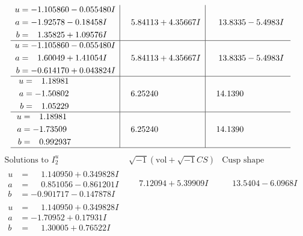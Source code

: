 \documentclass[1p]{elsarticle_modified}
\theoremstyle{definition}
\newcommand{\I}{\sqrt{-1}}
\begin{document}
$$\begin{array}{c|c|c}
\begin{aligned}
u &= -1.105860 - 0.055480 I \\
a &= -1.92578 - 0.18458 I \\
b &= \phantom{-}1.35825 + 1.09576 I\end{aligned}
 & \phantom{-}5.84113 + 4.35667 I & \phantom{-}13.8335 - 5.4983 I \\ \hline\begin{aligned}
u &= -1.105860 - 0.055480 I \\
a &= \phantom{-}1.60049 + 1.41054 I \\
b &= -0.614170 + 0.043824 I\end{aligned}
 & \phantom{-}5.84113 + 4.35667 I & \phantom{-}13.8335 - 5.4983 I \\ \hline\begin{aligned}
u &= \phantom{-}1.18981\phantom{ +0.000000I} \\
a &= -1.50802\phantom{ +0.000000I} \\
b &= \phantom{-}1.05229\phantom{ +0.000000I}\end{aligned}
 & \phantom{-}6.25240\phantom{ +0.000000I} & \phantom{-}14.1390\phantom{ +0.000000I} \\ \hline\begin{aligned}
u &= \phantom{-}1.18981\phantom{ +0.000000I} \\
a &= -1.73509\phantom{ +0.000000I} \\
b &= \phantom{-}0.992937\phantom{ +0.000000I}\end{aligned}
 & \phantom{-}6.25240\phantom{ +0.000000I} & \phantom{-}14.1390\phantom{ +0.000000I}\\
 \hline 
 \end{array}$$\newpage$$\begin{array}{c|c|c}  
\text{Solutions to }I^u_{2}& \I (\text{vol} + \sqrt{-1}CS) & \text{Cusp shape}\\
 \hline 
\begin{aligned}
u &= \phantom{-}1.140950 + 0.349828 I \\
a &= \phantom{-}0.851056 - 0.861201 I \\
b &= -0.901717 - 0.147878 I\end{aligned}
 & \phantom{-}7.12094 + 5.39909 I & \phantom{-}13.5404 - 6.0968 I \\ \hline\begin{aligned}
u &= \phantom{-}1.140950 + 0.349828 I \\
a &= -1.70952 + 0.17931 I \\
b &= \phantom{-}1.30005 + 0.76522 I\end{aligned}

\end{array}$$
\end{document}
